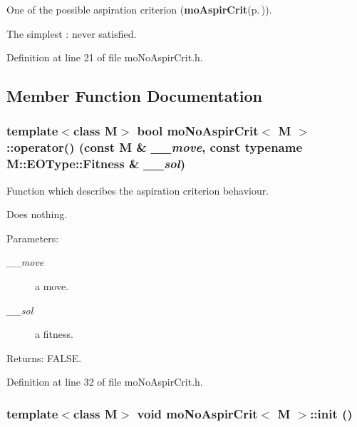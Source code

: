 One of the possible aspiration criterion ({\bf mo\-Aspir\-Crit}{\rm (p.\,\pageref{classmo_aspir_crit})}). 

The simplest : never satisfied. 



Definition at line 21 of file mo\-No\-Aspir\-Crit.h.

\subsection{Member Function Documentation}
\subsubsection{\setlength{\rightskip}{0pt plus 5cm}template$<$class M$>$ bool {\bf mo\-No\-Aspir\-Crit}$<$ M $>$::operator() (const M \& {\em \_\-\_\-move}, const typename M::EOType::Fitness \& {\em \_\-\_\-sol})\hspace{0.3cm}{\tt  [inline, private]}}\label{classmo_no_aspir_crit_8a7180a8d5c25bfb6727d0b59551b0f8}


Function which describes the aspiration criterion behaviour. 

Does nothing.

\begin{Desc}
\item[Parameters:]
\begin{description}
\item[{\em \_\-\_\-move}]a move. \item[{\em \_\-\_\-sol}]a fitness. \end{description}
\end{Desc}
\begin{Desc}
\item[Returns:]FALSE. \end{Desc}


Definition at line 32 of file mo\-No\-Aspir\-Crit.h.
\subsubsection{\setlength{\rightskip}{0pt plus 5cm}template$<$class M$>$ void {\bf mo\-No\-Aspir\-Crit}$<$ M $>$::init ()\hspace{0.3cm}{\tt  [inline, private, virtual]}}\label{classmo_no_aspir_crit_f3a286fc4c2d36bd390ba9a3074f3037}


